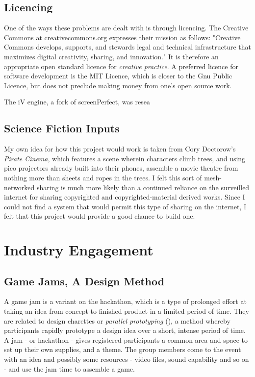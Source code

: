 \subsection{Licencing}
One of the ways these problems are dealt with is through licencing. The Creative Commons at creativecommons.org expresses their mission as follows: "Creative Commons develops, supports, and stewards legal and technical infrastructure that maximizes digital creativity, sharing, and innovation." It is therefore an appropriate open standard licence for \textit{creative practice}. A preferred licence for software development is the MIT Licence, which is closer to the Gnu Public Licence, but does not preclude making money from one's open source work.

The iV engine, a fork of screenPerfect, was resea

\subsection{Science Fiction Inputs}
My own idea for how this project would work is taken from Cory Doctorow's \textit{Pirate Cinema}, which features a scene wherein characters climb trees, and using pico projectors already built into their phones, assemble a movie theatre from nothing more than sheets and ropes in the trees. I felt this sort of mesh-networked sharing is much more likely than a continued reliance on the surveilled internet for sharing copyrighted and copyrighted-material derived works. Since I could not find a system that would permit this type of sharing on the internet, I felt that this project would provide a good chance to build one.

\section{Industry Engagement}

\subsection{Game Jams, A Design Method}

A game jam is a variant on the hackathon, which is a type of prolonged effort at taking an idea from concept to finished product in a limited period of time. They are related to design charettes or \textit{parallel prototyping} (\cite{charette}), a method whereby participants rapidly prototype a design idea over a short, intense period of time. A jam - or hackathon - gives registered participants a common area and space to set up their own supplies, and a theme. The group members come to the event with an idea and possibly some resources - video files, sound capability and so on - and use the jam time to assemble a game.

